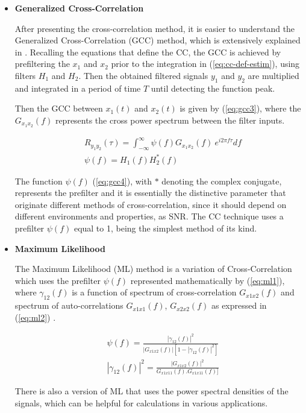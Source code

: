 \begin{itemize}
	\item \textbf{Generalized Cross-Correlation}

After presenting the cross-correlation method, it is easier to understand the Generalized Cross-Correlation (GCC) method, which is extensively explained in \cite{crosscorr}. Recalling the equations that define the CC, the GCC is achieved by prefiltering the $x_1$ and $x_2$ prior to the integration in (\ref{eq:cc-def-estim}), using filters $H_1$ and $H_2$. Then the obtained filtered signals $y_1$ and $y_2$ are multiplied and integrated in a period of time $T$ until detecting the function peak.

Then the GCC between $x_1(t)$ and $x_2(t)$ is given by (\ref{eq:gcc3}), where the $G_{x_1x_2}(f)$ represents the cross power spectrum between the filter inputs. 

\begin{eqnarray}
	& R_{y_1y_2}(\tau) = \int_{-\infty}^{\infty} \psi(f) G_{x_1x_2}(f)\ e^{i2\pi f\tau} df
	\label{eq:gcc3}\\
	& \psi(f) = H_1(f)H_2^*(f)
	\label{eq:gcc4}	
\end{eqnarray}

The function $\psi(f)$ (\ref{eq:gcc4}), with $*$ denoting the complex conjugate, represents the prefilter and it is essentially the distinctive parameter that originate different methods of cross-correlation, since it should depend on different environments and properties, as SNR. The CC technique uses a prefilter $\psi(f)$ equal to 1, being the simplest method of its kind.

\item \textbf{Maximum Likelihood}

The Maximum Likelihood (ML) method is a variation of Cross-Correlation which uses the prefilter $\psi(f)$ represented mathematically by (\ref{eq:ml1}), where $\gamma_{12}(f)$ is a function of spectrum of cross-correlation $G_{x1x2}(f)$ and spectrum of auto-correlations $G_{x1x1}(f)$, $G_{x2x2}(f)$ as expressed in (\ref{eq:ml2}) \cite{crosscorr}.

\begin{eqnarray}
& \psi(f) = \frac{|\gamma_{12}(f)|^2}{|G_{x1x2}(f)|[1-|\gamma_{12}(f)|^2]}
\label{eq:ml1} \\
& |\gamma_{12}(f)|^2 = \frac{|G_{x1x2}(f)|^2}{G_{x1x11}(f) . G_{x1x11}(f)]}
\label{eq:ml2} 
\end{eqnarray}

There is also a version of ML that uses the power spectral densities of the signals, which can be helpful for calculations in various applications. 
\end{itemize}

